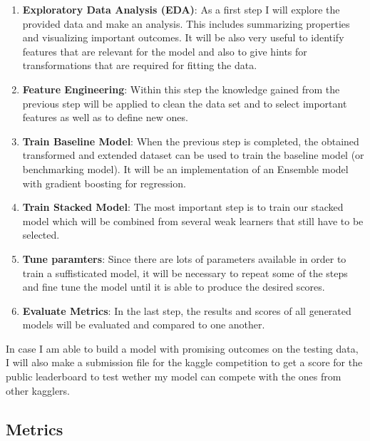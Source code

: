 \documentclass{article}
\begin{document}
\begin{enumerate}
    \item \textbf{Exploratory Data Analysis (EDA)}: As a first step I will explore the provided data and make an analysis. This includes summarizing properties and visualizing important outcomes. It will be also very useful to identify features that are relevant for the model and also to give hints for transformations that are required for fitting the data.
    \item \textbf{Feature Engineering}: Within this step the knowledge gained from the previous step will be applied to clean the data set and to select important features as well as to define new ones.
    \item \textbf{Train Baseline Model}: When the previous step is completed, the obtained transformed and extended dataset can be used to train the baseline model (or benchmarking model). It will be an implementation of an Ensemble model with gradient boosting for regression.
    \item \textbf{Train Stacked Model}: The most important step is to train our stacked model which will be combined from several weak learners that still have to be selected.
    \item \textbf{Tune paramters}: Since there are lots of parameters available in order to train a suffisticated model, it will be necessary to repeat some of the steps and fine tune the model until it is able to produce the desired scores.
    \item \textbf{Evaluate Metrics}: In the last step, the results and scores of all generated models will be evaluated and compared to one another.

    
\end{enumerate}

In case I am able to build a model with promising outcomes on the testing data, I will also make a submission file for the kaggle competition to get a score for the public leaderboard to test wether my model can compete with the ones from other kagglers.

\subsection{Metrics}
\end{document}
